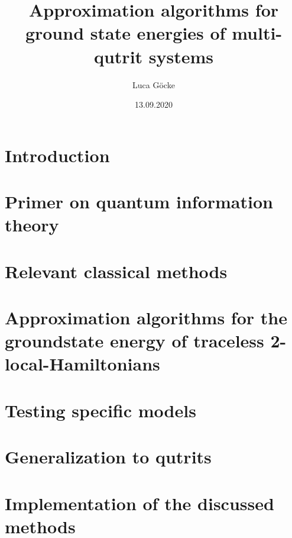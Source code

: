 \documentclass[pstricks,siunitx,theorem,british,draft=False]{tumphthesis}
\title{Approximation algorithms for ground state energies of multi-qutrit systems}
\author{Luca Göcke}
\date{13.09.2020}
\begin{document}
\frontmatter
\maketitle
\tableofcontents
\mainmatter
\chapter{Introduction}

\chapter{Primer on quantum information theory}

\chapter{Relevant classical methods}

\chapter{Approximation algorithms for the groundstate energy of traceless 2-local-Hamiltonians}

\chapter{Testing specific models}

\chapter{Generalization to qutrits}

\appendix
\chapter{Implementation of the discussed methods}

\backmatter
\printbibliography
\end{document}
